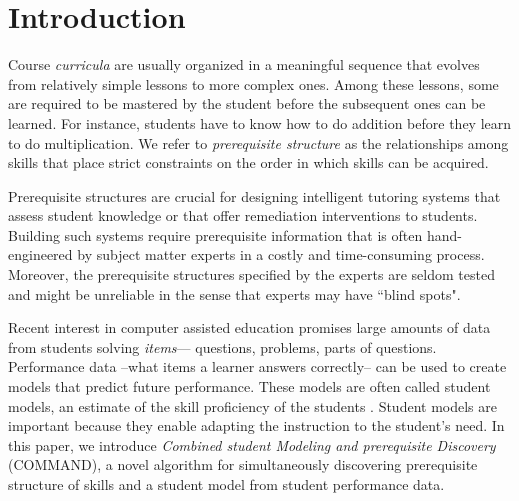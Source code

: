 \documentclass{edm_template}
\begin{document}
\section{Introduction}
\label{sec:introduction}
Course \textit{curricula} are usually organized in a meaningful sequence  that evolves from relatively simple lessons to more complex ones. 
Among these lessons, some are required to be mastered by the student  before the subsequent ones can be learned.
For instance, students have to know how to do addition before they learn to do multiplication.
We refer to \textit{prerequisite structure} as the relationships among skills that place strict constraints on the order in which  skills can be acquired. 

Prerequisite structures are crucial for designing intelligent tutoring systems that assess student knowledge or that offer remediation interventions to students.
Building such systems require prerequisite information that is often hand-engineered by subject matter experts in a costly and time-consuming process. 
Moreover, the prerequisite structures specified by the experts are seldom tested and might be unreliable in the sense that experts may have ``blind spots".


Recent interest in computer assisted education promises large amounts of data from students solving \textit{items}--- questions, problems, parts of questions.
Performance data --what items a learner answers correctly-- can be used to create models that predict future performance.
These models are often called student models, an estimate of the skill proficiency of the students \cite{vanlehn1988student}.
Student models are important because they enable adapting the instruction to the student's need.
In this paper, we introduce \emph{Combined student Modeling and prerequisite Discovery} (COMMAND), 
a novel algorithm for simultaneously discovering prerequisite structure of skills and a student model from student performance data.
\end{document}
